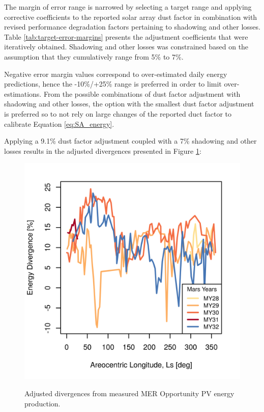 The margin of error range is narrowed by selecting a target range and applying corrective coefficients to the reported solar array dust factor in combination with revised performance degradation factors pertaining to shadowing and other losses. Table \ref{tab:target-error-margins} presents the adjustment coefficients that were iteratively obtained. Shadowing and other losses was constrained based on the assumption that they cumulatively range from 5\% to 7\%.

Negative error margin values correspond to over-estimated daily energy predictions, hence the -10\%/+25\% range is preferred in order to limit over-estimations. From the possible combinations of dust factor adjustment with shadowing and other losses, the option with the smallest dust factor adjustment is preferred so to not rely on large changes of the reported duct factor to calibrate Equation \ref{eq:SA_energy}.



\clearpage
Applying a 9.1\% dust factor adjustment coupled with a 7\% shadowing and other losses results in the adjusted divergences presented in Figure \ref{fig:plot:mer-energy-prediction-divergences-adjusted}:

\begin{figure}[h]
  \centering
  \hypersetup{linkcolor=captionTextColor}
  \includegraphics[width=0.8\linewidth]{sections/appendix/B/plots/energy-prediction-divergences-from-my28-to-my32-adjusted.png}\\
  \caption[Adjusted divergences from measured \ac{MER} Opportunity PV energy production]
          {Adjusted divergences from measured \ac{MER} Opportunity PV energy production.}
  \label{fig:plot:mer-energy-prediction-divergences-adjusted}
\end{figure}
